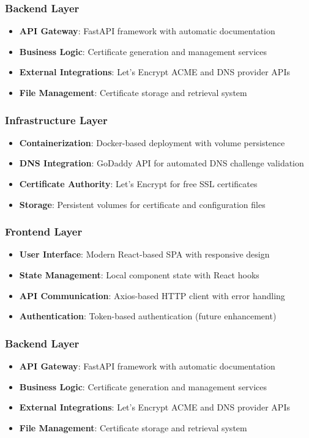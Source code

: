 \subsubsection{Backend Layer}
\begin{itemize}
    \item \textbf{API Gateway}: FastAPI framework with automatic documentation
    \item \textbf{Business Logic}: Certificate generation and management services
    \item \textbf{External Integrations}: Let's Encrypt ACME and DNS provider APIs
    \item \textbf{File Management}: Certificate storage and retrieval system
\end{itemize}

\subsubsection{Infrastructure Layer}
\begin{itemize}
    \item \textbf{Containerization}: Docker-based deployment with volume persistence
    \item \textbf{DNS Integration}: GoDaddy API for automated DNS challenge validation
    \item \textbf{Certificate Authority}: Let's Encrypt for free SSL certificates
    \item \textbf{Storage}: Persistent volumes for certificate and configuration files
\end{itemize}

\subsubsection{Frontend Layer}
\begin{itemize}
    \item \textbf{User Interface}: Modern React-based SPA with responsive design
    \item \textbf{State Management}: Local component state with React hooks
    \item \textbf{API Communication}: Axios-based HTTP client with error handling
    \item \textbf{Authentication}: Token-based authentication (future enhancement)
\end{itemize}

\subsubsection{Backend Layer}
\begin{itemize}
    \item \textbf{API Gateway}: FastAPI framework with automatic documentation
    \item \textbf{Business Logic}: Certificate generation and management services
    \item \textbf{External Integrations}: Let's Encrypt ACME and DNS provider APIs
    \item \textbf{File Management}: Certificate storage and retrieval system
\end{itemize}

